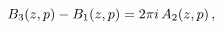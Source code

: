 \[\mathop{B_{3}\/}\nolimits\!\left(z,p\right)-\mathop{B_{1}\/}\nolimits\!\left(z%
,p\right)=2\pi i\mathop{A_{2}\/}\nolimits\!\left(z,p\right),\]